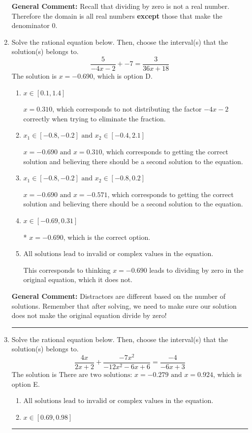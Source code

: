 \documentclass{extbook}[14pt]
\newcommand{\litem}[1]{\item #1

\rule{\textwidth}{0.4pt}}
\begin{document}
\begin{enumerate}
{\textbf{General Comment:} Recall that dividing by zero is not a real number. Therefore the domain is all real numbers \textbf{except} those that make the denominator 0.
}
\litem{
Solve the rational equation below. Then, choose the interval(s) that the solution(s) belongs to.
\[ \frac{5}{-4x -2} + -7 = \frac{3}{36x + 18} \]The solution is \( x = -0.690 \), which is option D.\begin{enumerate}[label=\Alph*.]
\item \( x \in [0.1,1.4] \)

$x = 0.310$, which corresponds to not distributing the factor $-4x -2$ correctly when trying to eliminate the fraction.
\item \( x_1 \in [-0.8, -0.2] \text{ and } x_2 \in [-0.4,2.1] \)

$x = -0.690 \text{ and } x = 0.310$, which corresponds to getting the correct solution and believing there should be a second solution to the equation.
\item \( x_1 \in [-0.8, -0.2] \text{ and } x_2 \in [-0.8,0.2] \)

$x = -0.690 \text{ and } x = -0.571$, which corresponds to getting the correct solution and believing there should be a second solution to the equation.
\item \( x \in [-0.69,0.31] \)

* $x = -0.690$, which is the correct option.
\item \( \text{All solutions lead to invalid or complex values in the equation.} \)

This corresponds to thinking $x = -0.690$ leads to dividing by zero in the original equation, which it does not.
\end{enumerate}

\textbf{General Comment:} Distractors are different based on the number of solutions. Remember that after solving, we need to make sure our solution does not make the original equation divide by zero!
}
\litem{
Solve the rational equation below. Then, choose the interval(s) that the solution(s) belongs to.
\[ \frac{4x}{2x + 2} + \frac{-7x^{2}}{-12x^{2} -6 x + 6} = \frac{-4}{-6x + 3} \]The solution is \( \text{There are two solutions: } x = -0.279 \text{ and } x = 0.924 \), which is option E.\begin{enumerate}[label=\Alph*.]
\item \( \text{All solutions lead to invalid or complex values in the equation.} \)


\item \( x \in [0.69,0.98] \)



\end{enumerate}}
\end{enumerate}
\end{document}

